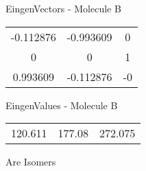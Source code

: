 \begin{multicols}{2}
\begin{center}
\vtab
 EingenVectors - Molecule B     \\
\vtab
\begin{tabular}{|c c c|}
-0.112876	 & 	-0.993609	 & 	0	 \\
0	 & 	0	 & 	1	 \\
0.993609	 & 	-0.112876	 & 	-0
\end{tabular}

\vtab
 EingenValues - Molecule B     \\
\vtab
\begin{tabular}{|c c c|}
120.611	 & 	177.08	 & 	272.075
\end{tabular}

\end{center}
\end{multicols}
\begin{center}
\vtab
\vtab
\textcolor{NavyBlue}{\Large Are Isomers}
\end{center}
\newpage

